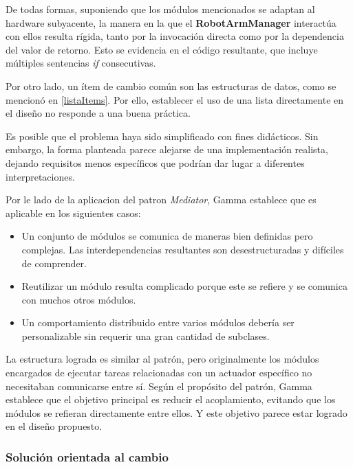 De todas formas, suponiendo que los módulos mencionados se adaptan al hardware subyacente, la manera en la que el \textbf{RobotArmManager} interactúa con ellos resulta rígida, tanto por la invocación directa como por la dependencia del valor de retorno. Esto se evidencia en el código resultante, que incluye múltiples sentencias \textit{if} consecutivas.

Por otro lado, un ítem de cambio común son las estructuras de datos, como se mencionó en \ref{listaItems}. Por ello, establecer el uso de una lista directamente en el diseño no responde a una buena práctica.

Es posible que el problema haya sido simplificado con fines didácticos. Sin embargo, la forma planteada parece alejarse de una implementación realista, dejando requisitos menos específicos que podrían dar lugar a diferentes interpretaciones.

Por le lado de la aplicacion del patron \textit{Mediator}, Gamma establece que es aplicable en los siguientes casos:
\begin{itemize}
\item Un conjunto de módulos se comunica de maneras bien definidas pero complejas. Las interdependencias resultantes son desestructuradas y difíciles de comprender.

\item Reutilizar un módulo resulta complicado porque este se refiere y se comunica con muchos otros módulos.

\item Un comportamiento distribuido entre varios módulos debería ser personalizable sin requerir una gran cantidad de subclases.
\end{itemize}

La estructura lograda es similar al patrón, pero originalmente los módulos encargados de ejecutar tareas relacionadas con un actuador específico no necesitaban comunicarse entre sí. Según el propósito del patrón, Gamma establece que el objetivo principal es reducir el acoplamiento, evitando que los módulos se refieran directamente entre ellos. Y este objetivo parece estar logrado en el diseño propuesto.

\subsubsection*{Solución orientada al cambio}

